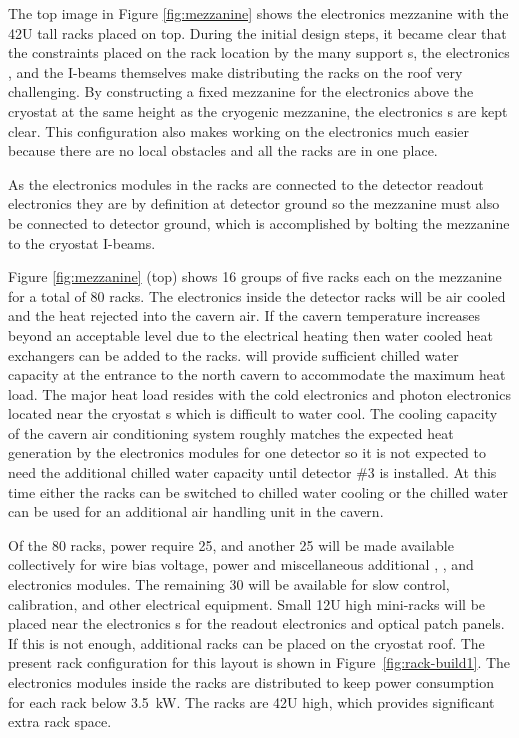 The top image in Figure \ref{fig:mezzanine} shows the  electronics mezzanine with the 42U tall racks placed on top. 
During the initial design steps, it became clear that the constraints placed on the rack location by the many  support \fdth{}s, the electronics \fdth, and the I-beams themselves make distributing the racks on the roof very challenging. 
By constructing a fixed mezzanine for the electronics above the cryostat at the same height as the cryogenic mezzanine, the electronics \fdth{}s are kept clear. 
This configuration also makes working on the electronics much easier because there are no local obstacles and all the racks are in one place.

As the electronics modules in the  racks are connected to the detector readout electronics they are by definition at detector ground so the mezzanine must also be connected to detector ground, which is accomplished by bolting the mezzanine to the cryostat I-beams. 
 
Figure \ref{fig:mezzanine} (top) shows 16 groups of five racks each
on the mezzanine for a total of 80 racks. 
The electronics inside the detector racks will be air cooled and the heat rejected into the cavern air. 
If the cavern temperature increases beyond an acceptable level due to the electrical heating then water cooled heat exchangers can be added to the racks.  will provide sufficient chilled water capacity at the entrance to the north cavern to accommodate the maximum heat load. 
The major heat load resides with the cold electronics and photon electronics located near the cryostat \fdth{}s which is difficult to water cool. 
The cooling capacity of the cavern air conditioning system roughly matches the expected heat generation by the electronics modules for one detector so it is not expected to need the additional chilled water capacity until detector \#3 is installed. 
At this time either the racks can be switched to chilled water cooling or the chilled water can be used for an additional air handling unit in the cavern.


Of the 80 racks,   power require \num{25}, and another 25 will be made available collectively for   wire bias voltage,  power and miscellaneous additional , , and   electronics modules. 
The remaining 30 will be available for slow control, calibration, and other electrical equipment. 
Small 12U high mini-racks will  be placed near the electronics \fdth{}s for the  readout electronics and optical patch panels. If this is not enough, additional racks can be placed on the cryostat roof. The present rack configuration for this layout is shown in Figure~\ref{fig:rack-build1}. 
The electronics modules inside the racks are distributed to keep power consumption for each rack below \SI{3.5}{kW}. 
The racks are 42U high, which provides significant extra rack space.  


